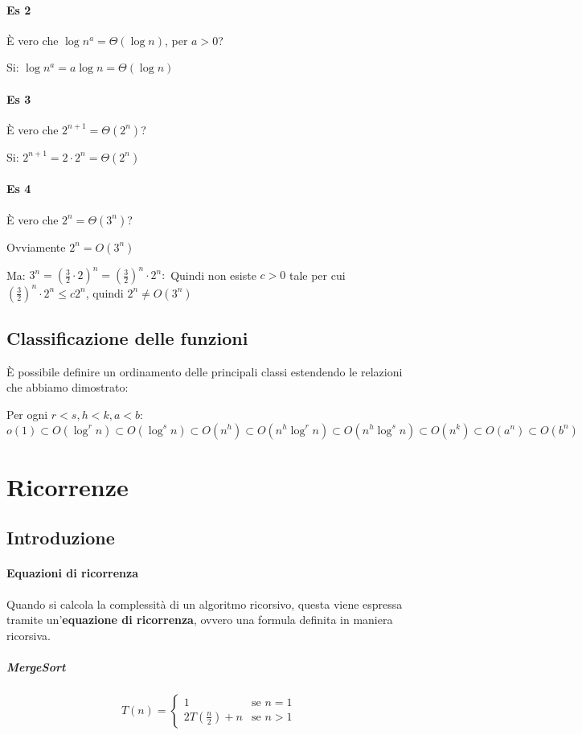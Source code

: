             \paragraph{Es 2}
                È vero che $ \log n^a = \Theta(\log n) $, per $ a>0 $?

                Si: $ \log n^a = a\log n = \Theta(\log n) $
            
            \paragraph{Es 3}
                È vero che $ 2^{n+1} = \Theta(2^n) $?

                Si: $ 2^{n+1} = 2\cdot 2^n = \Theta(2^n) $
            \paragraph{Es 4}    
                È vero che $ 2^{n} = \Theta(3^n) $?

                Ovviamente $ 2^{n} = O(3^n) $

                Ma: $ 3^{n} = \left(\frac32\cdot 2\right)^n=\left(\frac32\right)^n\cdot 2^n: $ Quindi non esiste $ c > 0 $ tale per cui $ \left(\frac32\right)^n\cdot 2^n\leq c2^n $, quindi $ 2^n \neq O(3^n) $
    \subsection{Classificazione delle funzioni}
        È possibile definire un ordinamento delle principali classi estendendo le relazioni che abbiamo dimostrato:
        
        Per ogni $r<s,h<k,a<b$:
        $$
            o(1) \subset O(\log^r n) \subset O(\log^s n) \subset O(n^h) \subset O(n^h \log^r n ) \subset O(n^h \log^s n) \subset O(n^k) \subset O(a^n) \subset O(b^n)
        $$
\section{Ricorrenze}
    \subsection{Introduzione}
        \paragraph{Equazioni di ricorrenza} Quando si calcola la complessità di un algoritmo ricorsivo, questa viene espressa tramite un'\textbf{equazione di ricorrenza}, ovvero una formula definita in maniera ricorsiva.
            \subparagraph{MergeSort}
                $$
                    T(n) = \begin{cases}
                        1 & \text{se } n=1 \\
                        2T\left(\frac{n}{2}\right) + n & \text{se } n>1
                    \end{cases}
                $$
